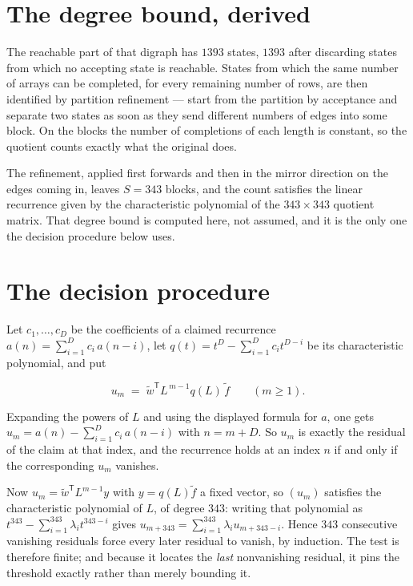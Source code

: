 \documentclass[11pt]{article}
\theoremstyle{definition}
\begin{document}
\section{The degree bound, derived}

The reachable part of that digraph has $1393$ states, $1393$ after discarding states from which no accepting state is reachable. States from which the same number of arrays can be completed, for every remaining number of rows, are then identified by partition refinement --- start from the partition by acceptance and separate two states as soon as they send different numbers of edges into some block. On the blocks the number of completions of each length is constant, so the quotient counts exactly what the original does.

The refinement, applied first forwards and then in the mirror direction on the edges coming in, leaves $S = 343$ blocks, and the count satisfies the linear recurrence given by the characteristic polynomial of the $343 \times 343$ quotient matrix. That degree bound is computed here, not assumed, and it is the only one the decision procedure below uses.

\section{The decision procedure}

Let $c_1,\dots,c_D$ be the coefficients of a claimed recurrence $a(n) = \sum_{i=1}^{D} c_i\,a(n-i)$, let $q(t) = t^{D} - \sum_{i=1}^{D} c_i t^{D-i}$ be its characteristic polynomial, and put

\[u_m \;=\; \tilde w^{\mathsf T} L^{\,m-1} q(L)\,\tilde f \qquad (m \ge 1).\]

Expanding the powers of $L$ and using the displayed formula for $a$, one gets $u_m = a(n) - \sum_{i=1}^{D} c_i\,a(n-i)$ with $n = m + D$. So $u_m$ is exactly the residual of the claim at that index, and the recurrence holds at an index $n$ if and only if the corresponding $u_m$ vanishes.

Now $u_m = \tilde w^{\mathsf T} L^{m-1} y$ with $y = q(L)\tilde f$ a fixed vector, so $(u_m)$ satisfies the characteristic polynomial of $L$, of degree $343$: writing that polynomial as $t^{343} - \sum_{i=1}^{343} \lambda_i t^{343-i}$ gives $u_{m+343} = \sum_{i=1}^{343} \lambda_i u_{m+343-i}$. Hence $343$ consecutive vanishing residuals force every later residual to vanish, by induction. The test is therefore finite; and because it locates the {\itshape last} nonvanishing residual, it pins the threshold exactly rather than merely bounding it.
\end{document}
